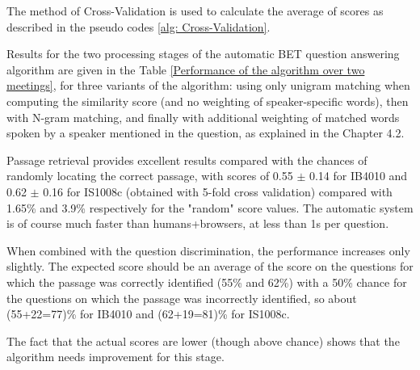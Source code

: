 The method of Cross-Validation is used to calculate the average of scores as described in the pseudo codes \ref{alg: Cross-Validation}.





Results for the two processing stages of the automatic BET question answering algorithm are given in the Table \ref{Performance of the algorithm over two meetings}, for three variants of the algorithm: using only unigram matching when computing the similarity score (and no weighting of speaker-specific words), then with N-gram matching, and finally with additional weighting of matched words spoken by a speaker mentioned in the question, as explained in the Chapter 4.2.

Passage retrieval provides excellent results compared with the chances of randomly locating the correct passage, with scores of 0.55 \ensuremath{\pm} 0.14 for IB4010 and 0.62 \ensuremath{\pm} 0.16 for IS1008c (obtained with 5-fold cross validation) compared with 1.65\% and 3.9\% respectively for the "random" score values. The automatic system is of course much faster than humans+browsers, at less than 1s per question.

When combined with the question discrimination, the performance increases only slightly. The expected score should be an average of the score on the questions for which the passage was correctly identified (55\% and 62\%) with a 50\%  chance for the questions on which the passage was incorrectly identified, so about (55+22=77)\% for IB4010 and (62+19=81)\% for IS1008c. 

The fact that the actual scores are lower (though above chance) shows that the algorithm needs improvement for this stage.


